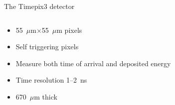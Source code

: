 \documentclass{beamer}
\begin{document}
\begin{frame}{\centering The Timepix3 detector}
  \begin{columns}
    \begin{column}{0.5\textwidth}
      \begin{itemize}
      \item{55~$\mu$m$\times$55~$\mu$m pixels}
      \item{Self triggering pixels}
      \item{Measure both time of arrival and deposited energy}
      \item{Time resolution 1--2~ns}
      \item{670~$\mu$m thick}
      \end{itemize}
     \end{column}
    \begin{column}{0.5\textwidth}
    \end{column}
  \end{columns}
 \end{frame}
\end{document}

